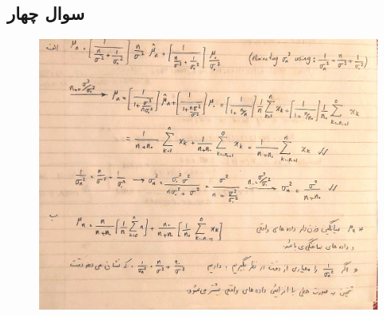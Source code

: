 \documentclass[12pt,onecolumn,a4paper]{article}
\begin{document}
\subsection{سوال چهار}
\begin{figure}[h!]
    \includegraphics[width=\linewidth]{q4.jpg}    
\end{figure}
\newpage
\end{document}
